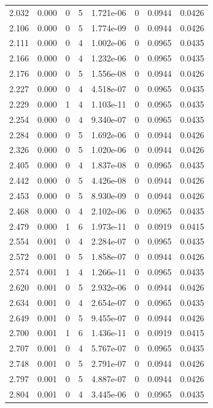 \documentclass[preview]{standalone}
\begin{document}
{{{\begin{tabular}{L{1.2cm}C{1.2cm} C{0.3cm}C{0.5cm} C{1.4cm}C{1.4cm} C{1.4cm}C{1.4cm}}
  2.032  &  0.000  & 0     &  5 &  1.721e-06  & 0  & 0.0944 &  0.0426   \\ 
  2.106  &  0.000  & 0     &  5 &  1.774e-09  & 0  & 0.0944 &  0.0426   \\ 
  2.111  &  0.000  & 0     &  4 &  1.002e-06  & 0  & 0.0965 &  0.0435   \\ 
  2.166  &  0.000  & 0     &  4 &  1.232e-06  & 0  & 0.0965 &  0.0435   \\ 
  2.176  &  0.000  & 0     &  5 &  1.556e-08  & 0  & 0.0944 &  0.0426   \\ 
  2.227  &  0.000  & 0     &  4 &  4.518e-07  & 0  & 0.0965 &  0.0435   \\ 
  2.229  &  0.000  & 1     &  4 &  1.103e-11  & 0  & 0.0965 &  0.0435   \\ 
  2.254  &  0.000  & 0     &  4 &  9.340e-07  & 0  & 0.0965 &  0.0435   \\ 
  2.284  &  0.000  & 0     &  5 &  1.692e-06  & 0  & 0.0944 &  0.0426   \\ 
  2.326  &  0.000  & 0     &  5 &  1.020e-06  & 0  & 0.0944 &  0.0426   \\ 
  2.405  &  0.000  & 0     &  4 &  1.837e-08  & 0  & 0.0965 &  0.0435   \\ 
  2.442  &  0.000  & 0     &  5 &  4.426e-08  & 0  & 0.0944 &  0.0426   \\ 
  2.453  &  0.000  & 0     &  5 &  8.930e-09  & 0  & 0.0944 &  0.0426   \\ 
  2.468  &  0.000  & 0     &  4 &  2.102e-06  & 0  & 0.0965 &  0.0435   \\ 
  2.479  &  0.000  & 1     &  6 &  1.973e-11  & 0  & 0.0919 &  0.0415   \\ 
  2.554  &  0.001  & 0     &  4 &  2.284e-07  & 0  & 0.0965 &  0.0435   \\ 
  2.572  &  0.001  & 0     &  5 &  1.858e-07  & 0  & 0.0944 &  0.0426   \\ 
  2.574  &  0.001  & 1     &  4 &  1.266e-11  & 0  & 0.0965 &  0.0435   \\ 
  2.620  &  0.001  & 0     &  5 &  2.932e-06  & 0  & 0.0944 &  0.0426   \\ 
  2.634  &  0.001  & 0     &  4 &  2.654e-07  & 0  & 0.0965 &  0.0435   \\ 
  2.649  &  0.001  & 0     &  5 &  9.455e-07  & 0  & 0.0944 &  0.0426   \\ 
  2.700  &  0.001  & 1     &  6 &  1.436e-11  & 0  & 0.0919 &  0.0415   \\ 
  2.707  &  0.001  & 0     &  4 &  5.767e-07  & 0  & 0.0965 &  0.0435   \\ 
  2.748  &  0.001  & 0     &  5 &  2.791e-07  & 0  & 0.0944 &  0.0426   \\ 
  2.797  &  0.001  & 0     &  5 &  4.887e-07  & 0  & 0.0944 &  0.0426   \\ 
  2.804  &  0.001  & 0     &  4 &  3.445e-06  & 0  & 0.0965 &  0.0435   \\ 
\hline 
\end{tabular} 

}}}
\end{document}
